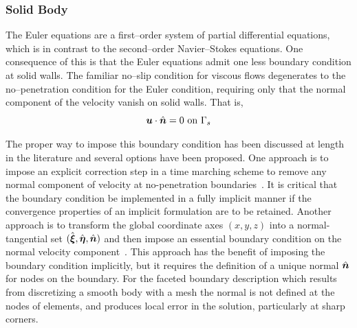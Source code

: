 \subsubsection{Solid Body\label{sect:comp_ns_bcs_solid}}
The Euler equations are a first--order system of partial differential equations, which is in contrast to the second--order Navier--Stokes equations.  One consequence of this is that the Euler equations admit one less boundary condition at solid walls.  The familiar no--slip condition for viscous flows degenerates to the no--penetration condition for the Euler condition, requiring only that the normal component of the velocity vanish on solid walls. That is,
\begin{equation}
  \label{eq:no_penetration}
  {\boldsymbol{u}}\cdot\hat{{\boldsymbol{n}}} = 0\mbox{ on } \Gamma_s
\end{equation}

The proper way to impose this boundary condition has been discussed at length in the literature and several options have been proposed.  One approach is to impose an explicit correction step in a time marching  scheme to remove any normal component of velocity at no-penetration boundaries~\cite{cfmht}.  It is critical that the boundary condition be implemented in a fully implicit manner if the convergence properties of an implicit formulation are to be retained.    Another approach is to transform the global coordinate axes $(x,y,z)$ into a normal-tangential set $(\hat{{\boldsymbol{\xi}}},\hat{{\boldsymbol{\eta}}},\hat{{\boldsymbol{n}}})$ and then impose an essential boundary condition on the normal velocity component~\cite{gjlebeau_thesis,skaliabadi_dissertation}.  This approach has the benefit of imposing the boundary condition implicitly, but it requires the definition of a unique normal $\hat{{\boldsymbol{n}}}$ for nodes on the boundary.  For the faceted boundary description which results from discretizing a smooth body with a mesh the normal is not defined at the nodes of elements, and produces local error in the solution, particularly at sharp corners.  

